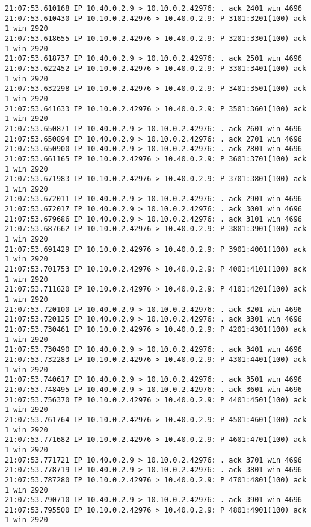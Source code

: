 \documentclass[a4paper,12pt]{article}
\begin{document}
\begin{Verbatim}
21:07:53.610168 IP 10.40.0.2.9 > 10.10.0.2.42976: . ack 2401 win 4696 
21:07:53.610430 IP 10.10.0.2.42976 > 10.40.0.2.9: P 3101:3201(100) ack 1 win 2920 
21:07:53.618655 IP 10.10.0.2.42976 > 10.40.0.2.9: P 3201:3301(100) ack 1 win 2920 
21:07:53.618737 IP 10.40.0.2.9 > 10.10.0.2.42976: . ack 2501 win 4696 
21:07:53.622452 IP 10.10.0.2.42976 > 10.40.0.2.9: P 3301:3401(100) ack 1 win 2920 
21:07:53.632298 IP 10.10.0.2.42976 > 10.40.0.2.9: P 3401:3501(100) ack 1 win 2920 
21:07:53.641633 IP 10.10.0.2.42976 > 10.40.0.2.9: P 3501:3601(100) ack 1 win 2920 
21:07:53.650871 IP 10.40.0.2.9 > 10.10.0.2.42976: . ack 2601 win 4696 
21:07:53.650894 IP 10.40.0.2.9 > 10.10.0.2.42976: . ack 2701 win 4696 
21:07:53.650900 IP 10.40.0.2.9 > 10.10.0.2.42976: . ack 2801 win 4696 
21:07:53.661165 IP 10.10.0.2.42976 > 10.40.0.2.9: P 3601:3701(100) ack 1 win 2920 
21:07:53.671983 IP 10.10.0.2.42976 > 10.40.0.2.9: P 3701:3801(100) ack 1 win 2920 
21:07:53.672011 IP 10.40.0.2.9 > 10.10.0.2.42976: . ack 2901 win 4696 
21:07:53.672017 IP 10.40.0.2.9 > 10.10.0.2.42976: . ack 3001 win 4696 
21:07:53.679686 IP 10.40.0.2.9 > 10.10.0.2.42976: . ack 3101 win 4696 
21:07:53.687662 IP 10.10.0.2.42976 > 10.40.0.2.9: P 3801:3901(100) ack 1 win 2920 
21:07:53.691429 IP 10.10.0.2.42976 > 10.40.0.2.9: P 3901:4001(100) ack 1 win 2920 
21:07:53.701753 IP 10.10.0.2.42976 > 10.40.0.2.9: P 4001:4101(100) ack 1 win 2920 
21:07:53.711620 IP 10.10.0.2.42976 > 10.40.0.2.9: P 4101:4201(100) ack 1 win 2920 
21:07:53.720100 IP 10.40.0.2.9 > 10.10.0.2.42976: . ack 3201 win 4696 
21:07:53.720125 IP 10.40.0.2.9 > 10.10.0.2.42976: . ack 3301 win 4696 
21:07:53.730461 IP 10.10.0.2.42976 > 10.40.0.2.9: P 4201:4301(100) ack 1 win 2920 
21:07:53.730490 IP 10.40.0.2.9 > 10.10.0.2.42976: . ack 3401 win 4696 
21:07:53.732283 IP 10.10.0.2.42976 > 10.40.0.2.9: P 4301:4401(100) ack 1 win 2920 
21:07:53.740617 IP 10.40.0.2.9 > 10.10.0.2.42976: . ack 3501 win 4696 
21:07:53.748495 IP 10.40.0.2.9 > 10.10.0.2.42976: . ack 3601 win 4696 
21:07:53.756370 IP 10.10.0.2.42976 > 10.40.0.2.9: P 4401:4501(100) ack 1 win 2920 
21:07:53.761764 IP 10.10.0.2.42976 > 10.40.0.2.9: P 4501:4601(100) ack 1 win 2920 
21:07:53.771682 IP 10.10.0.2.42976 > 10.40.0.2.9: P 4601:4701(100) ack 1 win 2920 
21:07:53.771721 IP 10.40.0.2.9 > 10.10.0.2.42976: . ack 3701 win 4696 
21:07:53.778719 IP 10.40.0.2.9 > 10.10.0.2.42976: . ack 3801 win 4696 
21:07:53.787280 IP 10.10.0.2.42976 > 10.40.0.2.9: P 4701:4801(100) ack 1 win 2920 
21:07:53.790710 IP 10.40.0.2.9 > 10.10.0.2.42976: . ack 3901 win 4696 
21:07:53.795500 IP 10.10.0.2.42976 > 10.40.0.2.9: P 4801:4901(100) ack 1 win 2920 

\end{Verbatim}
\end{document}
